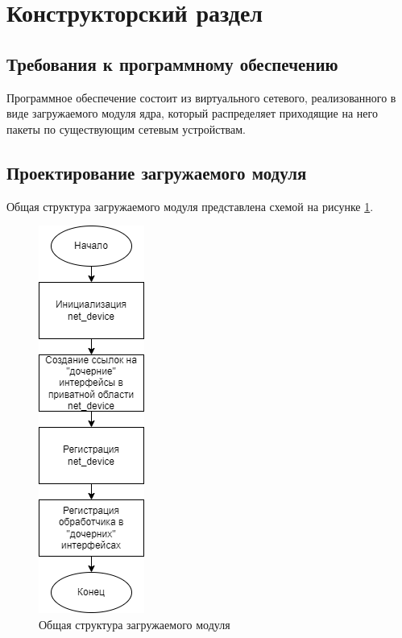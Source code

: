 \documentclass[14pt, a4paper]{extarticle}
\begin{document}
\section{Конструкторский раздел}
\subsection{Требования к программному обеспечению}
Программное обеспечение состоит из виртуального сетевого, реализованного в виде
загружаемого модуля ядра, который распределяет приходящие на него пакеты по существующим сетевым устройствам.

\subsection{Проектирование загружаемого модуля}
Общая структура загружаемого модуля представлена схемой на рисунке \ref{gen}.
\begin{figure}[H]
	\centering
	\includegraphics[scale=0.9]{gen.png}
	\caption{Общая структура загружаемого модуля}
	\label{gen}
\end{figure}
\end{document}
